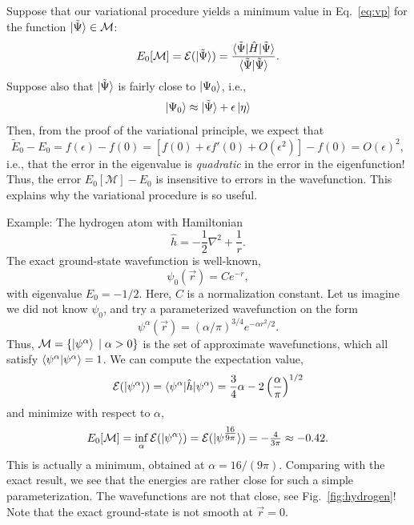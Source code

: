 \documentclass{report}
\theoremstyle{plain}
\theoremstyle{definition}
\begin{document}
Suppose that our variational procedure yields a minimum value in
Eq.~\eqref{eq:vp} for the function $\ket{\tilde{\Psi}} \in
\mathcal{M}$:
\begin{equation}
  E_0[\mathcal{M}] = \mathcal{E}(\ket{\tilde{\Psi}}) =
  \frac{\braket{\tilde{\Psi}|\hat{H}|\tilde{\Psi}}}{\braket{\tilde{\Psi}|\tilde{\Psi}}}. 
\end{equation}
Suppose also that $\ket{\tilde{\Psi}}$ is fairly close to
$\ket{\Psi_0}$, i.e.,
\begin{equation}
  \ket{\Psi_0} \approx \ket{\tilde{\Psi}} + \epsilon \ket{\eta}
\end{equation}
Then, from the proof of the variational principle, we expect that
\begin{equation}
  \tilde{E}_0 - E_0 = f(\epsilon) - f(0) = [f(0) + \epsilon f'(0) +
  O(\epsilon^2)] -f(0)  =  O(\epsilon)^2,
\end{equation}
i.e., that the error in the eigenvalue is \emph{quadratic} in the
error in the eigenfunction! Thus, the error $E_0[\mathcal{M}] - E_0$
is insensitive to errors in the wavefunction. This explains why the
variational procedure is so useful.

Example: The hydrogen atom with Hamiltonian 
\begin{equation}
  \hat{h} = -\frac{1}{2}\nabla^2 + \frac{1}{r}.
\end{equation}
The exact ground-state wavefunction is well-known, 
\begin{equation}
  \psi_0(\vec{r}) = C e^{-r},
\end{equation}
with eigenvalue $E_0 = -1/2$. Here, $C$ is a normalization constant. Let us imagine we did not know
$\psi_0$, and try a parameterized wavefunction on the form
\begin{equation}
  \psi^\alpha(\vec{r}) = (\alpha/\pi)^{3/4} e^{-\alpha r^2/2}.
\end{equation}
Thus, $\mathcal{M} = \{ \ket{\psi^\alpha} \;|\; \alpha > 0 \}$ is the
set of approximate wavefunctions, which all satisfy
$\braket{\psi^\alpha|\psi^\alpha} = 1$.
 We can compute the expectation value,
\begin{equation}
  \mathcal{E}(\ket{\psi^\alpha}) = \braket{\psi^\alpha|\hat{h}|\psi^\alpha} =
  \frac{3}{4}\alpha - 2 \left(\frac{\alpha}{\pi}\right)^{1/2}
\end{equation}
and minimize with respect to $\alpha$,
\begin{equation}
  E_0[\mathcal{M}] = \inf_\alpha \mathcal{E}(\ket{\psi^\alpha}) = \mathcal{E}(\ket{\psi^{\tfrac{16}{9\pi}}}) = -\tfrac{4}{3\pi} \approx -0.42.
\end{equation}
This is actually a minimum, obtained at $\alpha=16/(9\pi)$. Comparing with
the exact result, we see that the energies are rather close for such a
simple parameterization. The
wavefunctions are not that close, see Fig.~\ref{fig:hydrogen}! Note that the exact ground-state is
not smooth at $\vec{r}=0$.
\end{document}
